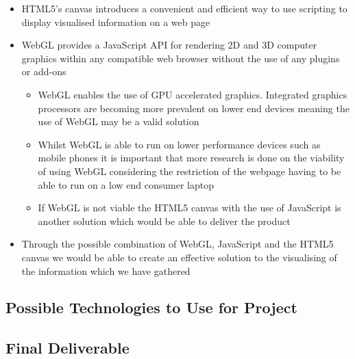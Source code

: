 \documentclass{article}
\begin{document}
\begin{itemize}
			\begin{itemize}
				\item HTML5's canvas introduces a convenient and efficient way to use scripting to display visualised information on a web page
				\item WebGL provides a JavaScript API for rendering 2D and 3D computer graphics within any compatible web browser without the use of any plugins or add-ons
				\begin{itemize}
					\item WebGL enables the use of GPU accelerated graphics. Integrated graphics processors are becoming more prevalent on lower end devices meaning the use of WebGL may be a valid solution
					\item Whilst WebGL is able to run on lower performance devices such as mobile phones it is important that more research is done on the viability of using WebGL considering the restriction of the webpage having to be able to run on a low end consumer laptop
					\item If WebGL is not viable the HTML5 canvas with the use of JavaScript is another solution which would be able to deliver the product
				\end{itemize}
				\item Through the possible combination of WebGL, JavaScript and the HTML5 canvas we would be able to create an effective solution to the visualising of the information which we have gathered
			\end{itemize}
		\end{itemize}
	\subsection{Possible Technologies to Use for Project}
	\subsection{Final Deliverable}
\end{document}
